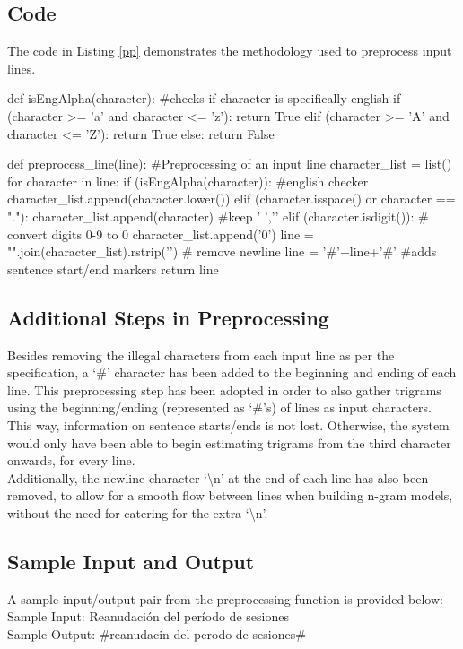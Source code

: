 \documentclass[12pt]{article}
\begin{document}
\subsection{Code}
The code in Listing \ref{pp} demonstrates the methodology used to preprocess input lines.
\begin{python}[caption = {Line Preprocessing},label = {pp}]
def isEngAlpha(character):
#checks if character is specifically english
	if (character >= 'a' and character <= 'z'):
		return True
	elif (character >= 'A' and character <= 'Z'):
		return True
	else:
		return False

def preprocess_line(line):
#Preprocessing of an input line
	character_list = list()
	for character in line:
		if (isEngAlpha(character)): #english checker
			character_list.append(character.lower()) 
		elif (character.isspace() or character == "."): 
			character_list.append(character) #keep ' ','.'
		elif (character.isdigit()):
			# convert digits {0-9} to 0
			character_list.append('0') 
	line = "".join(character_list).rstrip('\n') # remove newline  
	line = '#'+line+'#' #adds sentence start/end markers
	return line
\end{python}
\subsection{Additional Steps in Preprocessing}
Besides removing the illegal characters from each input line as per the specification, a `\#' character has been added to the beginning and ending of each line. This preprocessing step has been adopted in order to also gather trigrams using the beginning/ending (represented as `\#'s) of lines as input characters.  This way, information on sentence starts/ends is not lost.  Otherwise, the system would only have been able to begin estimating trigrams from the third character onwards, for every line.\\
\hfill\break
Additionally, the newline character `\textbackslash n' at the end of each line has also been removed, to allow for a smooth flow between lines when building n-gram models, without the need for catering for the extra `\textbackslash n'.
\subsection{Sample Input and Output}
A sample input/output pair from the preprocessing function is provided below:\\
\hfill\break
Sample Input: Reanudación del período de sesiones\\
Sample Output: \#reanudacin del perodo de sesiones\#
\end{document}
